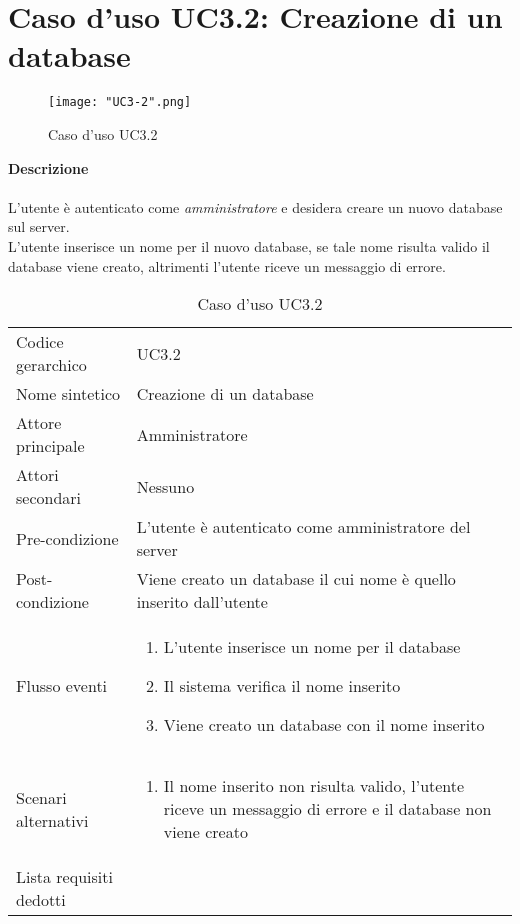\documentclass[a4paper]{report}
\begin{document}
	 \section{Caso d'uso UC3.2: Creazione di un database}
	 	\begin{figure}[H]
			\centering
			\texttt{[image: "UC3-2".png]}
			\caption{Caso d'uso UC3.2}
		\end{figure}
	 \textbf{Descrizione} \\ \\
	 L'utente è autenticato come \emph{amministratore} e desidera creare un nuovo database sul server. 
	 \\ L'utente inserisce un nome per il nuovo database, se tale nome risulta valido il database viene
	  creato, altrimenti l'utente riceve un messaggio di errore. \\
		\begin{table}[H]
		\begin{tabularx}{\textwidth}{X | X}\toprule
			\rowcolor{orange!65}Codice gerarchico & UC3.2 \\
			Nome sintetico & Creazione di un database \\
			\rowcolor{orange!65}Attore principale & Amministratore\\
			Attori secondari & Nessuno \\
			\rowcolor{orange!65}Pre-condizione & L'utente è autenticato come amministratore del server\\
			Post-condizione & Viene creato un database il cui nome è quello inserito dall'utente \\
			\rowcolor{orange!65}Flusso eventi & \begin{enumerate}
			\item L'utente inserisce un nome per il database
			\item Il sistema verifica il nome inserito
			\item Viene creato un database con il nome inserito
			\end{enumerate} \\
			Scenari alternativi & \begin{enumerate}
			\item Il nome inserito non risulta valido, l'utente riceve un messaggio di errore e il database non
			 viene creato
			\end{enumerate} \\
			\rowcolor{orange!65}Lista requisiti dedotti & \\
			\bottomrule
		\end{tabularx}
		\caption{Caso d'uso UC3.2}
	 \end{table}
\end{document}
